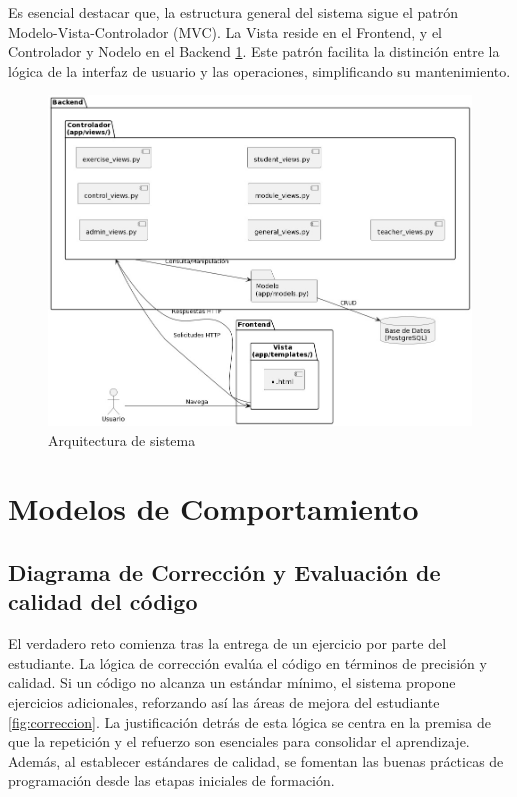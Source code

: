 Es esencial destacar que, la estructura general del sistema sigue el patrón Modelo-Vista-Controlador (MVC). La Vista reside en el Frontend, y el Controlador y Nodelo en el Backend \ref{fig:arqsistema}. Este patrón facilita la distinción entre la lógica de la interfaz de usuario y las operaciones, simplificando su mantenimiento.

\begin{figure}[H]
    \centering
    \includegraphics[width=\textwidth]{imagenes/ArquitecturaDeSistema.jpeg}
    
    \caption{Arquitectura de sistema}
    \label{fig:arqsistema}
\end{figure}

\section{Modelos de Comportamiento}

\subsection{Diagrama de Corrección y Evaluación de calidad del código}

El verdadero reto comienza tras la entrega de un ejercicio por parte del estudiante. La lógica de corrección evalúa el código en términos de precisión y calidad. Si un código no alcanza un estándar mínimo, el sistema propone ejercicios adicionales, reforzando así las áreas de mejora del estudiante \ref{fig:correccion}. La justificación detrás de esta lógica se centra en la premisa de que la repetición y el refuerzo son esenciales para consolidar el aprendizaje. Además, al establecer estándares de calidad, se fomentan las buenas prácticas de programación desde las etapas iniciales de formación.

